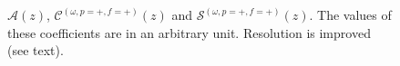 \begin{figure}[H]
\begin{minipage}{.48\linewidth}
\end{minipage}
\caption{$ \mathcal{A}(z) $, $ \mathcal{C}^{(\omega,p=+,f=+)}(z) $ and $ \mathcal{S}^{(\omega,p=+,f=+)}(z) $. The values of these coefficients are in an arbitrary unit. Resolution is improved (see text).}
\label{ACSz_1}
\end{figure}
